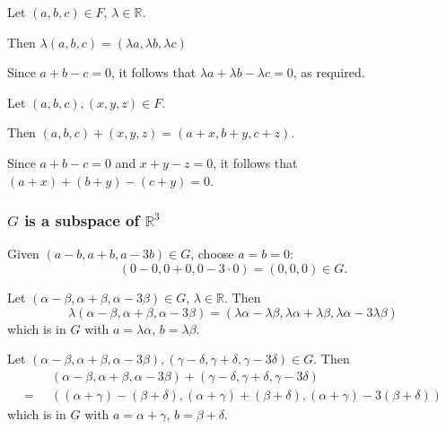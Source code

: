 \documentclass[11pt]{article}
\newcommand{\R}{\mathbb{R}}
\theoremstyle{definition}
\theoremstyle{plain}
\theoremstyle{remark}
\newcounter{subsubsubsection}[subsubsection]
\begin{document}
\begin{enumerate}

          Let $(a, b, c) \in F$, $\lambda \in \R$.

          Then $\lambda (a, b, c) = (\lambda a, \lambda b, \lambda c)$

          Since $a + b - c = 0$, it follows that $\lambda a + \lambda b - \lambda c = 0$, as required.


          Let $(a, b, c), (x, y, z) \in F$.

          Then $ (a, b, c) + (x, y, z) = (a + x, b + y, c + z) $.

          Since $a + b - c = 0$ and $x + y - z = 0$, it follows that $(a + x) + (b + y) - (c + y) = 0$.

          \subsubsection*{$G$ is a subspace of $\R^3$}


          Given $(a - b, a + b, a - 3b) \in G$, choose $a = b = 0$:
          \[
              (0 - 0, 0 + 0, 0 - 3 \cdot 0) = (0, 0, 0) \in G.
          \]


          Let $(\alpha - \beta, \alpha + \beta, \alpha - 3\beta) \in G$, $\lambda \in \R$.  Then
          \[
              \lambda (\alpha - \beta, \alpha + \beta, \alpha - 3\beta) = (\lambda \alpha - \lambda \beta, \lambda \alpha + \lambda \beta, \lambda \alpha - 3\lambda \beta)
          \]
          which is in $G$ with $a = \lambda \alpha$, $b = \lambda \beta$.


          Let $(\alpha - \beta, \alpha + \beta, \alpha - 3\beta), (\gamma - \delta, \gamma + \delta, \gamma - 3\delta) \in G$.  Then
          \[
              \begin{aligned}
                         & (\alpha - \beta, \alpha + \beta, \alpha - 3\beta) + (\gamma - \delta, \gamma + \delta, \gamma - 3\delta)            \\
                  = \;\; & ((\alpha + \gamma) - (\beta + \delta), (\alpha + \gamma) + (\beta + \delta), (\alpha + \gamma) - 3(\beta + \delta))
              \end{aligned}
          \]
          which is in $G$ with $a = \alpha + \gamma$, $b = \beta + \delta$.


\end{enumerate}
\end{document}
